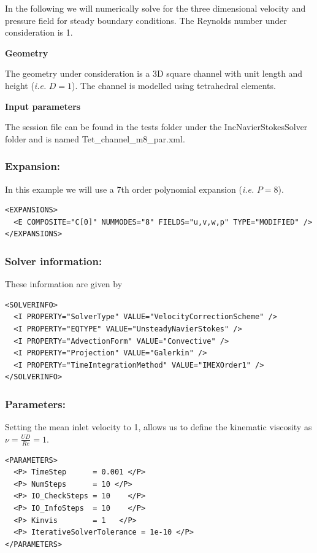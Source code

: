 In the following we will numerically solve for the three dimensional velocity and pressure field for steady boundary conditions. The Reynolds number under consideration is 1.

\textbf{Geometry}

The geometry under consideration is a 3D square channel with unit length and height (\textit{i.e.} $D=1$). The channel is modelled using tetrahedral elements.

\textbf{Input parameters}

The session file can be found in the tests folder under the IncNavierStokesSolver folder and is named Tet\_channel\_m8\_par.xml.

\subsubsection{Expansion:~} In this example we will use a 7th order polynomial expansion (\textit{i.e.} $P=8$).
\begin{lstlisting}[style=XMLStyle]
<EXPANSIONS>
  <E COMPOSITE="C[0]" NUMMODES="8" FIELDS="u,v,w,p" TYPE="MODIFIED" />
</EXPANSIONS>
\end{lstlisting}

\subsubsection{Solver information:~} These information are given by
\begin{lstlisting}[style=XMLStyle]
<SOLVERINFO>
  <I PROPERTY="SolverType" VALUE="VelocityCorrectionScheme" />
  <I PROPERTY="EQTYPE" VALUE="UnsteadyNavierStokes" />
  <I PROPERTY="AdvectionForm" VALUE="Convective" />
  <I PROPERTY="Projection" VALUE="Galerkin" />
  <I PROPERTY="TimeIntegrationMethod" VALUE="IMEXOrder1" />
</SOLVERINFO>
\end{lstlisting}

\subsubsection{Parameters:~} Setting the mean inlet velocity to 1, allows us to define the kinematic viscosity as $\nu = \frac{UD}{Re}=1$.
\begin{lstlisting}[style=XMLStyle]
<PARAMETERS>
  <P> TimeStep      = 0.001 </P>
  <P> NumSteps      = 10 </P>
  <P> IO_CheckSteps = 10    </P>
  <P> IO_InfoSteps  = 10    </P>
  <P> Kinvis        = 1   </P>
  <P> IterativeSolverTolerance = 1e-10 </P>
</PARAMETERS>
\end{lstlisting}

